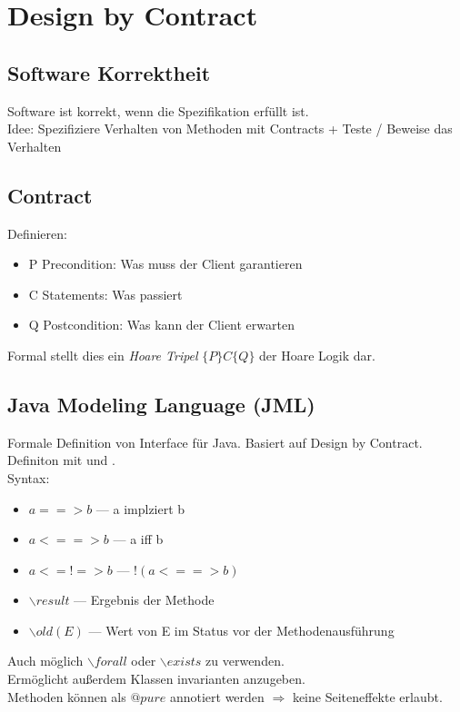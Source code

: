 


\section{Design by Contract}
\subsection{Software Korrektheit}
Software ist korrekt, wenn die Spezifikation erfüllt ist.\\
Idee: Spezifiziere Verhalten von Methoden mit Contracts + Teste / Beweise das Verhalten

\subsection{Contract}
Definieren:
\begin{itemize}
  \item P Precondition: Was muss der Client garantieren
  \item C Statements: Was passiert
  \item Q Postcondition: Was kann der Client erwarten
\end{itemize}
Formal stellt dies ein \textit{Hoare Tripel} \(\{P\} C \{Q\}\) der Hoare Logik dar.

\subsection{Java Modeling Language (JML)}
Formale Definition von Interface für Java. Basiert auf Design by Contract. Definiton mit  und
.\\
Syntax:
\begin{itemize}
  \item \(a ==> b\) --- a implziert b
  \item \(a <==> b\) --- a iff b
  \item \(a <=!=> b\) --- \(!(a<==>b)\)
  \item \(\backslash result\) --- Ergebnis der Methode
  \item \(\backslash old(E)\) --- Wert von E im Status vor der Methodenausführung
\end{itemize}
Auch möglich \(\backslash forall\) oder \(\backslash exists\) zu verwenden.\\
Ermöglicht außerdem Klassen invarianten anzugeben.\\
Methoden können als \(@pure\) annotiert werden \(\Rightarrow\) keine Seiteneffekte erlaubt.

